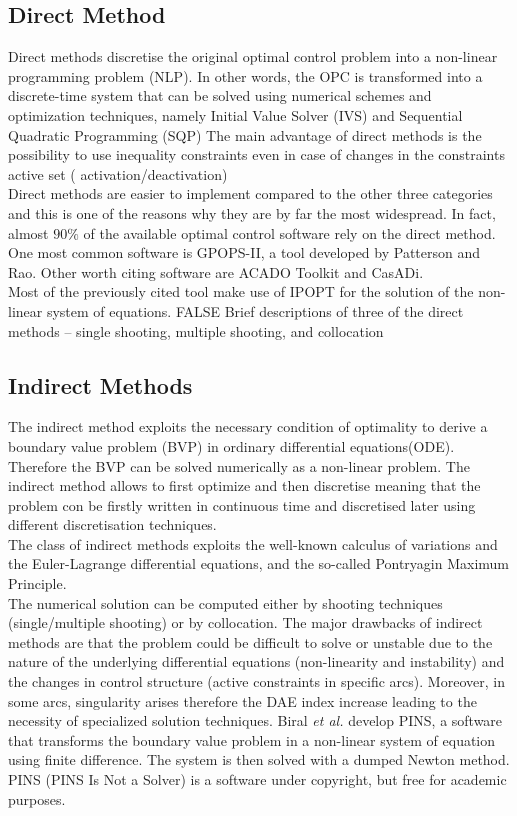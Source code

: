 \subsection{Direct Method}
%
Direct methods discretise the original optimal control problem into a non-linear programming problem (NLP). In other words, the OPC is transformed into a discrete-time system that can be solved using numerical schemes and optimization techniques, namely Initial Value Solver (IVS) and Sequential Quadratic Programming (SQP) \cite{bertolazzi2005symbolic}
The main advantage of direct methods is the possibility to use inequality constraints even in case of changes in the constraints active set ( activation/deactivation)\cite{biral2016notes}\\
Direct methods are easier to implement compared to the other three categories and this is one of the reasons why they are by far the most widespread. In fact, almost $90\%$ of the available optimal control software rely on the direct method. \cite{rao2009survey,rodrigues2014optimal}
One most common software is GPOPS-II\cite{patterson2014gpops}, a tool developed by Patterson and Rao. Other worth citing software are ACADO Toolkit\cite{Houska2011a} and CasADi\cite{Andersson2019}.\\
Most of the previously cited tool make use of IPOPT for the solution of the non-linear system of equations.\cite{wachter2006implementation}
%
\if FALSE
Brief descriptions
of three of the direct methods – single shooting, multiple shooting, and collocation
\fi
%
\subsection{Indirect Methods}
%
The indirect method exploits the necessary condition of optimality to derive a boundary value problem (BVP) in ordinary differential equations(ODE). Therefore the BVP can be solved numerically as a non-linear problem. The indirect method allows to first optimize and then discretise meaning that the problem con be firstly written in continuous time and discretised later using different discretisation techniques.\\
The class of indirect methods exploits the well-known calculus of variations and the Euler-Lagrange differential equations, and the so-called Pontryagin Maximum Principle.\cite{bertolazzi2006symbolic} \\
The numerical solution can be computed either by shooting techniques (single/multiple shooting) or by collocation.
The major drawbacks of indirect methods are that the problem could be difficult to solve or unstable due to the nature of the underlying differential equations (non-linearity and instability) and the changes in control structure (active constraints in specific arcs). Moreover, in some arcs, singularity arises therefore the DAE index increase leading to the necessity of specialized solution techniques. \cite{biral2016notes}
Biral \textit{et al.}\cite{biral2016notes} develop PINS, a software that transforms the boundary value problem in a non-linear system of equation using finite difference. The system is then solved with a dumped Newton method. PINS (PINS Is Not a Solver) is a software under copyright, but free for academic purposes. 
%
